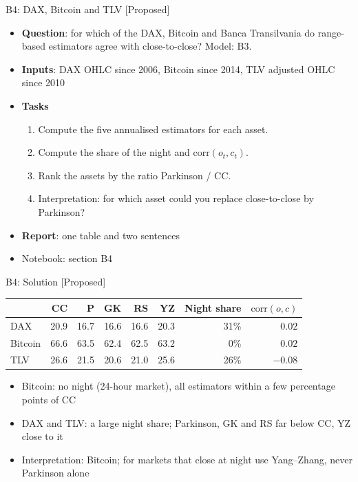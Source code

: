 \begin{frame}{B4: DAX, Bitcoin and TLV [Proposed]}
\itemsize{\footnotesize}
\begin{itemize}
\item \textbf{Question}: for which of the DAX, Bitcoin and Banca Transilvania do range-based estimators agree with close-to-close? Model: B3.
\item \textbf{Inputs}: DAX OHLC since 2006, Bitcoin since 2014, TLV adjusted OHLC since 2010
\item \textbf{Tasks}
\begin{enumerate}
    \item Compute the five annualised estimators for each asset.
    \item Compute the share of the night and $\mathrm{corr}(o_t, c_t)$.
    \item Rank the assets by the ratio Parkinson / CC.
    \item Interpretation: for which asset could you replace close-to-close by Parkinson?
\end{enumerate}
\item \textbf{Report}: one table and two sentences
\item Notebook: section B4
\end{itemize}
\end{frame}

\ifsolutions
\begin{frame}{B4: Solution [Proposed]}
\itemsize{\footnotesize}
\begin{center}
\footnotesize
\begin{tabular}{lrrrrrrr}
\toprule
& CC & P & GK & RS & YZ & \textbf{Night share} & $\mathrm{corr}(o, c)$ \\
\midrule
DAX & 20.9 & 16.7 & 16.6 & 16.6 & 20.3 & 31\% & ${0.02}$ \\
Bitcoin & 66.6 & 63.5 & 62.4 & 62.5 & 63.2 & 0\% & ${0.02}$ \\
TLV & 26.6 & 21.5 & 20.6 & 21.0 & 25.6 & 26\% & ${-0.08}$ \\
\bottomrule
\end{tabular}
\end{center}
\begin{itemize}
    \item Bitcoin: no night (24-hour market), all estimators within a few percentage points of CC
    \item DAX and TLV: a large night share; Parkinson, GK and RS far below CC, YZ close to it
    \item Interpretation: Bitcoin; for markets that close at night use Yang--Zhang, never Parkinson alone
\end{itemize}
\end{frame}
\fi

